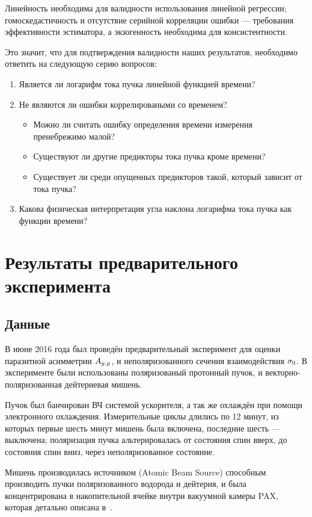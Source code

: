 \documentclass{article}
\begin{document}
	Линейность необходима для валидности использования линейной регрессии; гомоскедастичность и отсутствие серийной корреляции ошибки --- требования эффективности эстиматора, а экзогенность необходима для консистентности.
	
	Это значит, что для подтверждения валидности наших результатов, необходимо ответить на следующую серию вопросов:
	\begin{enumerate}
		\item Является ли логарифм тока пучка линейной функцией времени?
		\item Не являются ли ошибки коррелироваными со временем?
		\begin{itemize}
			\item Можно ли считать ошибку определения времени измерения пренебрежимо малой?
			\item Существуют ли другие предикторы тока пучка кроме времени?
			\item Существует ли среди опущенных предикторов такой, который зависит от тока пучка?
		\end{itemize}
		\item Какова физическая интерпретация угла наклона логарифма тока пучка как функции времени?
	\end{enumerate}
		
	\section{Результаты предварительного эксперимента}
	\subsection{Данные}
	В июне 2016 года был проведён предварительный эксперимент для оценки паразитной асимметрии $\Ayy$, и неполяризованного сечения взаимодействия $\CS[0]$. В эксперименте были использованы поляризованый протонный пучок, и векторно-поляризованная дейтериевая мишень. 
	
	Пучок был банчирован ВЧ системой ускорителя, а так же охлаждён при помощи электронного охлаждения. Измерительные циклы длились по 12 минут, из которых первые шесть минут мишень была включена, последние шесть --- выключена; поляризация пучка альтерировалась от состояния спин вверх, до состояния спин вниз, через неполяризованное состояние. 
	
	Мишень производилась источником (Atomic Beam Source) способным производить пучки поляризованного водорода и дейтерия, и была концентрирована в накопительной ячейке внутри вакуумной камеры PAX, которая детально описана в~\cite{Weidemann}.
	
\end{document}
